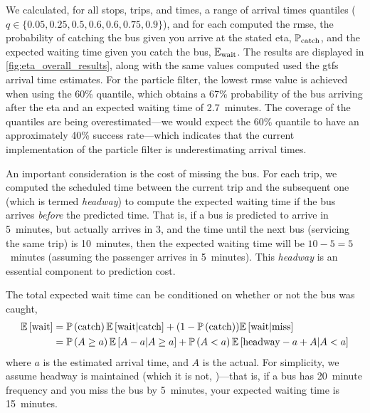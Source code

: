We calculated, for all stops, trips, and times, a range of arrival times quantiles ($q \in \{0.05, 0.25, 0.5, 0.6, 0.6, 0.75, 0.9\}$), and for each computed the \gls{rmse}, the probability of catching the bus given you arrive at the stated \gls{eta}, $\mathbb{P}_\text{catch}$, and the expected waiting time given you catch the bus, $\mathbb{E}_\text{wait}$. The results are displayed in \cref{fig:eta_overall_results}, along with the same values computed used the \gls{gtfs} arrival time estimates. For the particle filter, the lowest \gls{rmse} value is achieved when using the 60\% quantile, which obtains a 67\% probability of the bus arriving after the \gls{eta} and an expected waiting time of 2.7~minutes. The coverage of the quantiles are being overestimated---we would expect the 60\% quantile to have an approximately 40\% success rate---which indicates that the current implementation of the particle filter is underestimating arrival times.


\begin{knitrout}\small
{}\color{fgcolor}\begin{kframe}


{\ttfamily\noindent\bfseries\color{errorcolor}{\#\# Error in eval(lhs, parent, parent): object 'c05' not found}}\end{kframe}
\end{knitrout}

An important consideration is the cost of missing the bus. For each trip, we computed the scheduled time between the current trip and the subsequent one (which is termed \emph{headway}) to compute the expected waiting time if the bus arrives \emph{before} the predicted time. That is, if a bus is predicted to arrive in 5~minutes, but actually arrives in 3, and the time until the next bus (servicing the same trip) is 10~minutes, then the expected waiting time will be $10-5=5$~minutes (assuming the passenger arrives in 5~minutes). This \emph{headway} is an essential component to prediction cost.

The total expected wait time can be conditioned on whether or not the bus was caught,
\begin{equation}
\label{eq:eta_wait_conditional}
\begin{split}
\mathbb{E}\left[\text{wait}\right] &=
  \mathbb{P}\left(\text{catch}\right) \mathbb{E}\left[\text{wait}|\text{catch}\right] +
  (1 - \mathbb{P}\left(\text{catch}\right)) \mathbb{E}\left[\text{wait}|\text{miss}\right] \\
  &= \mathbb{P}\left(A \geq a\right) \mathbb{E}\left[A - a | A \geq a\right] +
  \mathbb{P}\left(A < a\right)\mathbb{E}\left[\text{headway} - a + A | A < a\right]
\end{split}
\end{equation}
where $a$ is the estimated arrival time, and $A$ is the actual. For simplicity, we assume headway is maintained (which it is not, \citet{})---that is, if a bus has 20~minute frequency and you miss the bus by 5~minutes, your expected waiting time is 15~minutes.

